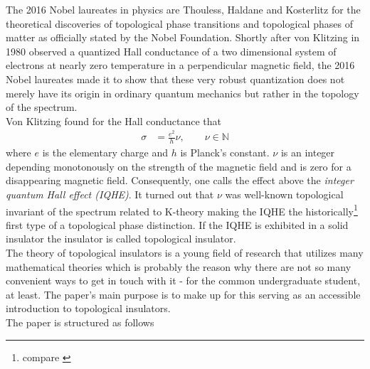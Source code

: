\nocite{eda79af1}
\nocite{fd8cbb36}
\nocite{1706ae98}
The 2016 Nobel laureates in physics are Thouless, Haldane and Kosterlitz {\glqq}for the theoretical discoveries of topological phase transitions and topological phases of matter{\grqq} as officially stated by the Nobel Foundation. Shortly after von Klitzing in 1980 observed a quantized Hall conductance of a two dimensional system of electrons at nearly zero temperature in a perpendicular magnetic field, the 2016 Nobel laureates made it to show that these very robust quantization does not merely have its origin in ordinary quantum mechanics but rather in the topology of the spectrum.
\\
Von Klitzing found for the Hall conductance that
\begin{align*}
  \sigma
  &=
  \frac{e^{2}}{h}
  \nu
  ,\qquad
  \nu
  \in
  \mathbb{N}
\end{align*}
where $e$ is the elementary charge and $h$ is Planck's constant. $\nu$ is an integer depending monotonously on the strength of the magnetic field and is zero for a disappearing magnetic field. Consequently, one calls the effect above the \textit{integer quantum Hall effect (IQHE)}. It turned out that $\nu$ was well-known topological invariant of the spectrum related to K-theory making the IQHE the historically\footnote{compare \cite{1706ae98}} first type of a topological phase distinction. If the IQHE is exhibited in a solid insulator the insulator is called topological insulator.
\\
The theory of topological insulators is a young field of research that utilizes many mathematical theories which is probably the reason why there are not so many convenient ways to get in touch with it - for the common undergraduate student, at least. The paper's main purpose is to make up for this serving as an accessible introduction to topological insulators.
\\
The paper is structured as follows
